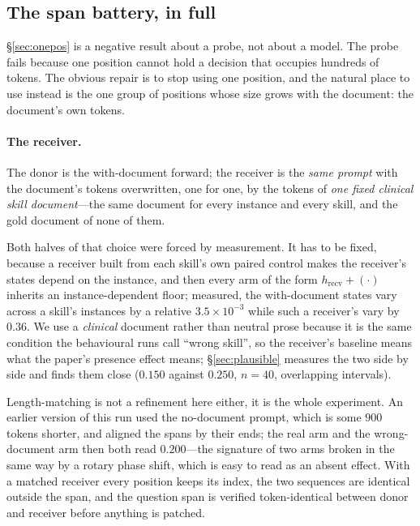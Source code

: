 \documentclass{article}
\begin{document}
\subsection{The span battery, in full}
\label{app:battery}

\S\ref{sec:onepos} is a negative result about a probe, not about a model. The
probe fails because one position cannot hold a decision that occupies hundreds
of tokens. The obvious repair is to stop using one position, and the natural
place to use instead is the one group of positions whose size grows with the
document: the document's own tokens.

\paragraph{The receiver.} The donor is the with-document forward; the receiver
is the \emph{same prompt} with the document's tokens overwritten, one for one,
by the tokens of \emph{one fixed clinical skill document}---the same document
for every instance and every skill, and the gold document of none of them.

Both halves of that choice were forced by measurement. It has to be fixed,
because a receiver built from each skill's own paired control makes the
receiver's states depend on the instance, and then every arm of the form
$h_{\text{recv}} + (\cdot)$ inherits an instance-dependent floor; measured, the
with-document states vary across a skill's instances by a relative
$3.5\times10^{-3}$ while such a receiver's vary by $0.36$. We use a
\emph{clinical} document rather than neutral prose because it is the same
condition the behavioural runs call
``wrong skill'', so the receiver's baseline means what the paper's presence
effect means; \S\ref{sec:plausible} measures the two side by side and finds them
close ($0.150$ against $0.250$, $n=40$, overlapping intervals).

Length-matching is not a refinement here either, it is the whole experiment. An
earlier version of this run used the no-document
prompt, which is some $900$ tokens shorter, and aligned the spans by their ends;
the real arm and the wrong-document arm then both read $0.200$---the signature
of two arms broken in the same way by a rotary phase shift, which is easy to
read as an absent effect. With a matched receiver every position keeps its
index, the two sequences are identical outside the span, and the question span
is verified token-identical between donor and receiver before anything is
patched.
\end{document}
